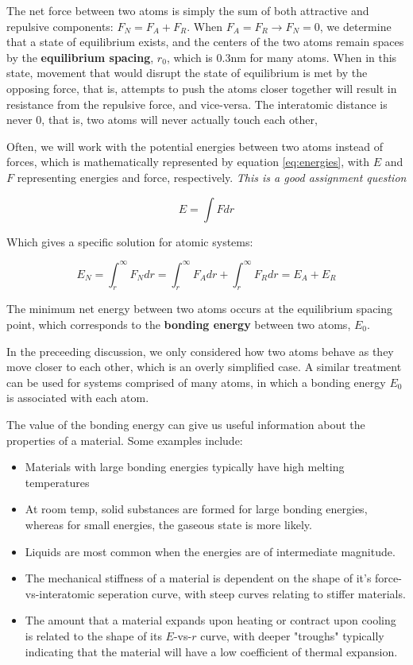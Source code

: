 \documentclass{article}
\begin{document}
The net force between two atoms is simply the sum of both attractive and repulsive components: $F_N = F_A + F_R$. When $F_A = F_R \to F_N = 0$, we determine that a state of equilibrium exists, and the centers of the two atoms remain spaces by the \textbf{equilibrium spacing}, $r_0$, which is $0.3 \text{nm}$ for many atoms. When in this state, movement that would disrupt the state of equilibrium is met by the opposing force, that is, attempts to push the atoms closer together will result in resistance from the repulsive force, and vice-versa. The interatomic distance is never 0, that is, two atoms will never actually touch each other,

Often, we will work with the potential energies between two atoms instead of forces, which is mathematically represented by equation \ref{eq:energies}, with $E$ and $F$ representing energies and force, respectively. \textit{This is a good assignment question}

\begin{equation}\label{eq:energies}
    E = \int F dr
\end{equation}

Which gives a specific solution for atomic systems:

\begin{equation}
    E_N = \int_r^{\infty} F_N dr = \int_r^{\infty} F_A dr + \int_r^{\infty} F_R dr = E_A + E_R
\end{equation}

The minimum net energy between two atoms occurs at the equilibrium spacing point, which corresponds to the \textbf{bonding energy} between two atoms, $E_0$.

In the preceeding discussion, we only considered how two atoms behave as they move closer to each other, which is an overly simplified case. A similar treatment can be used for systems comprised of many atoms, in which a bonding energy $E_0$ is associated with each atom.

The value of the bonding energy can give us useful information about the properties of a material. Some examples include:

\begin{itemize}
    \item Materials with large bonding energies typically have high melting temperatures
    \item At room temp, solid substances are formed for large bonding energies, whereas for small energies, the gaseous state is more likely.
    \item Liquids are most common when the energies are of intermediate magnitude.
    \item The mechanical stiffness of a material is dependent on the shape of it's force-vs-interatomic seperation curve, with steep curves relating to stiffer materials.
    \item The amount that a material expands upon heating or contract upon cooling is related to the shape of its $E$-vs-$r$ curve, with deeper "troughs" typically indicating that the material will have a low coefficient of thermal expansion.
\end{itemize}
\end{document}
